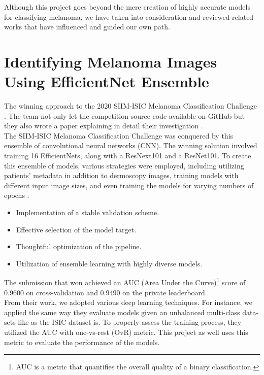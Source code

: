 Although this project goes beyond the mere creation of highly accurate models
for classifying melanoma, we have taken into consideration and reviewed related
works that have influenced and guided our own path.

\section{Identifying Melanoma Images Using EfficientNet Ensemble}

The winning approach to the 2020 SIIM-ISIC Melanoma Classification Challenge
\cite{ISICKaggle}. The team not only let the competition source code available
on GitHub \cite{WinningISICGithub} but they also wrote a paper explaining in
detail their investigation \cite{WinningISIC}. \\

The SIIM-ISIC Melanoma Classification Challenge was conquered by this ensemble of
convolutional neural networks (CNN). The winning solution involved training 16
EfficientNets, along with a ResNext101 and a ResNet101. To create this ensemble
of models, various strategies were employed, including utilizing patients'
metadata in addition to dermoscopy images, training models with different input
image sizes, and even training the models for varying numbers of epochs
\cite{WinningISIC}.

\begin{itemize}
  \item Implementation of a stable validation scheme.
  \item Effective selection of the model target.
  \item Thoughtful optimization of the pipeline.
  \item Utilization of ensemble learning with highly diverse models.
\end{itemize}

The submission that won achieved an AUC (Area Under the Curve)\footnote{AUC is
a metric that quantifies the overall quality of a binary classification.} score
of 0.9600 on cross-validation and 0.9490 on the private leaderboard. \\

From their work, we adopted various deep learning techniques. For instance, we
applied the same way they evaluate models given an unbalanced multi-class
data-sets like as the ISIC dataset is. To properly assess the training process,
they utilized the AUC with one-vs-rest (OvR) metric. This project as well uses
this metric to evaluate the performance of the models. \\


